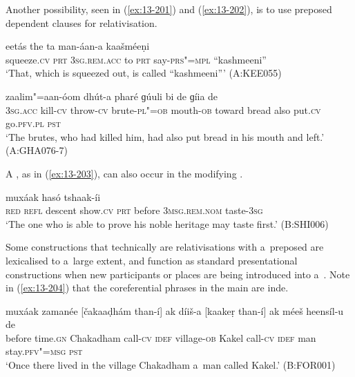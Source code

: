 Another possibility, seen in (\ref{ex:13-201}) and (\ref{ex:13-202}), is to use preposed dependent  clauses for relativisation.

\begin{exe}
\ex
\label{ex:13-201}
\gll [preeṣaá ba] eetás the ta man-áan-a  kaašméeṇi \\
squeeze.\textsc{cv} \textsc{prt} \textsc{3sg.rem.acc} to \textsc{prt} say-\textsc{prs"=mpl}  ``kashmeeni'' \\
\glt `That, which is squeezed out, is called ``kashmeeni''' (A:KEE055)

\ex
\label{ex:13-202}
 zaalim"=aan-óom dhút-a  pharé ɡúuli bi de ɡíia de \\
\textsc{3sg.acc} kill-\textsc{cv} throw-\textsc{cv} brute-\textsc{pl"=ob} mouth-\textsc{ob}  toward bread also put.\textsc{cv} go.\textsc{pfv.pl} \textsc{pst} \\
\glt `The brutes, who had killed him, had also put bread in his mouth and left.' (A:GHA076-7) 
\end{exe}

A , as in (\ref{ex:13-203}), can also occur in the modifying . 

\begin{exe}
\ex
\label{ex:13-203}
 muxáak hasó  tshaak-íi \\
\textsc{red} \textsc{refl} descent show.\textsc{cv} \textsc{prt} before \textsc{3msg.rem.nom}  taste-\textsc{3sg} \\
\glt `The one who is able to prove his noble heritage may taste first.' (B:SHI006) 
\end{exe}

Some constructions that technically are relativisations with a~preposed   are lexicalised to a~large extent, and function as standard presentational constructions when new participants or places are being introduced into a~. Note in (\ref{ex:13-204}) that the coreferential  phrases in the main  are inde.

\begin{exe}
\ex
\label{ex:13-204}
\gll muxáak zamanée [čakaaḍhám than-í] ak díiš-a  [kaakeṛ than-í] ak méeš heensíl-u de  \\
before time.\textsc{gn} Chakadham call-\textsc{cv} \textsc{idef} village-\textsc{ob}  Kakel call-\textsc{cv} \textsc{idef} man stay.\textsc{pfv"=msg} \textsc{pst} \\
\glt `Once there lived in the village Chakadham a~man called Kakel.' (B:FOR001)
\end{exe}

